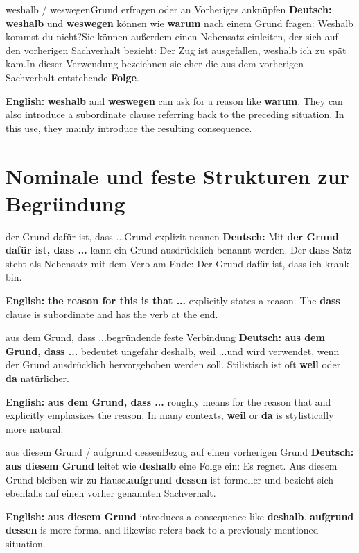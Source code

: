 \documentclass[a4paper,11pt]{article}
\newcommand{\GermanText}[1]{\textbf{Deutsch: }#1\par}
\newcommand{\EnglishText}[1]{{\small\color{SoftGray}\textbf{English: }#1\par}}
\begin{document}
        \begin{grammarentry}{weshalb / weswegen}{Grund erfragen oder an Vorheriges anknüpfen}
            \GermanText{\textbf{weshalb} und \textbf{weswegen} können wie \textbf{warum} nach einem Grund fragen: \glqq Weshalb kommst du nicht?\grqq Sie können außerdem einen Nebensatz einleiten, der sich auf den vorherigen Sachverhalt bezieht: \glqq Der Zug ist ausgefallen, weshalb ich zu spät kam.\grqq In dieser Verwendung bezeichnen sie eher die aus dem vorherigen Sachverhalt entstehende \textbf{Folge}.}
            \EnglishText{\textbf{weshalb} and \textbf{weswegen} can ask for a reason like \textbf{warum}. They can also introduce a subordinate clause referring back to the preceding situation. In this use, they mainly introduce the resulting consequence.}
        \end{grammarentry}

    \section{Nominale und feste Strukturen zur Begründung}

        \begin{grammarentry}{der Grund dafür ist, dass ...}{Grund explizit nennen}
            \GermanText{Mit \textbf{der Grund dafür ist, dass ...} kann ein Grund ausdrücklich benannt werden. Der \textbf{dass}-Satz steht als Nebensatz mit dem Verb am Ende: \glqq Der Grund dafür ist, dass ich krank bin.\grqq}
            \EnglishText{\textbf{the reason for this is that ...} explicitly states a reason. The \textbf{dass} clause is subordinate and has the verb at the end.}
        \end{grammarentry}

        \begin{grammarentry}{aus dem Grund, dass ...}{begründende feste Verbindung}
            \GermanText{\textbf{aus dem Grund, dass ...} bedeutet ungefähr \glqq deshalb, weil ...\grqq und wird verwendet, wenn der Grund ausdrücklich hervorgehoben werden soll. Stilistisch ist oft \textbf{weil} oder \textbf{da} natürlicher.}
            \EnglishText{\textbf{aus dem Grund, dass ...} roughly means for the reason that and explicitly emphasizes the reason. In many contexts, \textbf{weil} or \textbf{da} is stylistically more natural.}
        \end{grammarentry}

        \begin{grammarentry}{aus diesem Grund / aufgrund dessen}{Bezug auf einen vorherigen Grund}
            \GermanText{\textbf{aus diesem Grund} leitet wie \textbf{deshalb} eine Folge ein: \glqq Es regnet. Aus diesem Grund bleiben wir zu Hause.\grqq \textbf{aufgrund dessen} ist formeller und bezieht sich ebenfalls auf einen vorher genannten Sachverhalt.}
            \EnglishText{\textbf{aus diesem Grund} introduces a consequence like \textbf{deshalb}. \textbf{aufgrund dessen} is more formal and likewise refers back to a previously mentioned situation.}
        \end{grammarentry}
\end{document}
